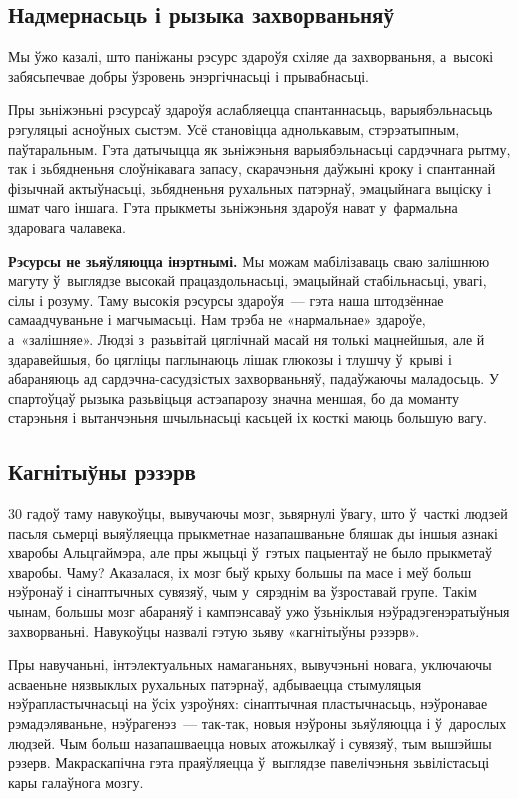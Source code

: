 \subsection*{Надмернасьць і рызыка захворваньняў} 

Мы ўжо казалі, што паніжаны рэсурс здароўя схіляе да захворваньня, а~высокі забясьпечвае добры ўзровень энэргічнасьці і прывабнасьці. 

Пры зьніжэньні рэсурсаў здароўя аслабляецца спантаннасьць, варыябэльнасьць рэгуляцыі асноўных сыстэм. Усё становіцца аднолькавым, стэрэатыпным, паўтаральным. Гэта датычыцца як зьніжэньня варыябэльнасьці сардэчнага рытму, так і зьбядненьня слоўнікавага запасу, скарачэньня даўжыні кроку і спантаннай фізычнай актыўнасьці, зьбядненьня рухальных патэрнаў, эмацыйнага выціску і шмат чаго іншага. Гэта прыкметы зьніжэньня здароўя нават у~фармальна здаровага чалавека.

\textbf{Рэсурсы не зьяўляюцца інэртнымі.} Мы можам мабілізаваць сваю залішнюю магуту ў~выглядзе высокай працаздольнасьці, эмацыйнай стабільнасьці, увагі, сілы і розуму. Таму высокія рэсурсы здароўя~--- гэта наша штодзённае самаадчуваньне і магчымасьці. Нам трэба не «нармальнае» здароўе, а~«залішняе». Людзі з~разьвітай цяглічнай масай ня толькі мацнейшыя, але й здаравейшыя, бо цягліцы паглынаюць лішак глюкозы і тлушчу ў~крыві і абараняюць ад сардэчна-сасудзістых захворваньняў, падаўжаючы маладосьць. У спартоўцаў рызыка разьвіцьця астэапарозу значна меншая, бо да моманту старэньня і вытанчэньня шчыльнасьці касьцей іх косткі маюць большую вагу.

\subsection*{Кагнітыўны рэзэрв}

30 гадоў таму навукоўцы, вывучаючы мозг, зьвярнулі ўвагу, што ў~часткі людзей пасьля сьмерці выяўляецца прыкметнае назапашваньне бляшак ды іншыя азнакі хваробы Альцгаймэра, але пры жыцьці ў~гэтых пацыентаў не было прыкметаў хваробы. Чаму? Аказалася, іх мозг быў крыху большы па масе і меў больш нэўронаў і сінаптычных сувязяў, чым у~сярэднім ва ўзроставай групе. Такім чынам, большы мозг абараняў і кампэнсаваў ужо ўзьніклыя нэўрадэгенэратыўныя захворваньні. Навукоўцы назвалі гэтую зьяву «кагнітыўны рэзэрв».

Пры навучаньні, інтэлектуальных намаганьнях, вывучэньні новага, уключаючы асваеньне нязвыклых рухальных патэрнаў, адбываецца стымуляцыя нэўрапластычнасьці на ўсіх узроўнях: сінаптычная пластычнасьць, нэўронавае рэмадэляваньне, нэўрагенэз~--- так-так, новыя нэўроны зьяўляюцца і ў~дарослых людзей. Чым больш назапашваецца новых атожылкаў і сувязяў, тым вышэйшы рэзерв. Макраскапічна гэта праяўляецца ў~выглядзе павелічэньня зьвілістасьці кары галаўнога мозгу. 

